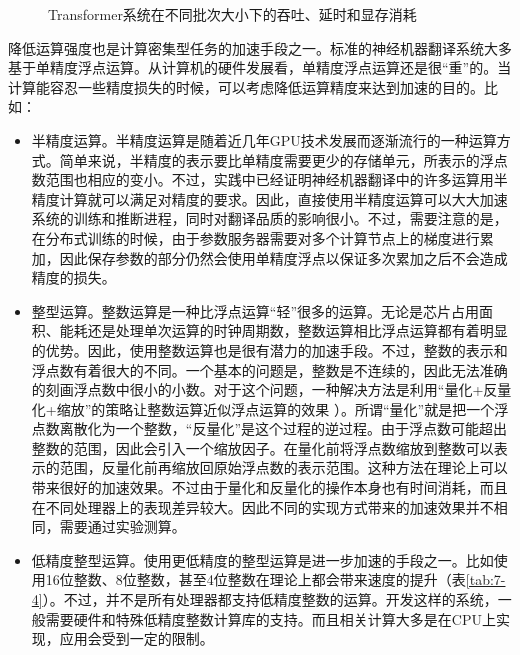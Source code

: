 \begin{figure}[htp]
\centering

\caption{Transformer系统在不同批次大小下的吞吐、延时和显存消耗}
\label{fig:7-23}
\end{figure}

\vspace{0.5em}
\vspace{0.5em}

\parinterval 降低运算强度也是计算密集型任务的加速手段之一。标准的神经机器翻译系统大多基于单精度浮点运算。从计算机的硬件发展看，单精度浮点运算还是很``重''的。当计算能容忍一些精度损失的时候，可以考虑降低运算精度来达到加速的目的。比如：

\begin{itemize}
\vspace{0.5em}
\item 半精度运算。半精度运算是随着近几年GPU技术发展而逐渐流行的一种运算方式。简单来说，半精度的表示要比单精度需要更少的存储单元，所表示的浮点数范围也相应的变小。不过，实践中已经证明神经机器翻译中的许多运算用半精度计算就可以满足对精度的要求。因此，直接使用半精度运算可以大大加速系统的训练和推断进程，同时对翻译品质的影响很小。不过，需要注意的是，在分布式训练的时候，由于参数服务器需要对多个计算节点上的梯度进行累加，因此保存参数的部分仍然会使用单精度浮点以保证多次累加之后不会造成精度的损失。

\vspace{0.5em}
\item 整型运算。整数运算是一种比浮点运算``轻''很多的运算。无论是芯片占用面积、能耗还是处理单次运算的时钟周期数，整数运算相比浮点运算都有着明显的优势。因此，使用整数运算也是很有潜力的加速手段。不过，整数的表示和浮点数有着很大的不同。一个基本的问题是，整数是不连续的，因此无法准确的刻画浮点数中很小的小数。对于这个问题，一种解决方法是利用``量化+反量化+缩放''的策略让整数运算近似浮点运算的效果 \cite{DBLP:journals/corr/abs-1906-00532,DBLP:conf/cvpr/JacobKCZTHAK18,DBLP:journals/corr/abs-1910-10485}）。所谓``量化''就是把一个浮点数离散化为一个整数，``反量化''是这个过程的逆过程。由于浮点数可能超出整数的范围，因此会引入一个缩放因子。在量化前将浮点数缩放到整数可以表示的范围，反量化前再缩放回原始浮点数的表示范围。这种方法在理论上可以带来很好的加速效果。不过由于量化和反量化的操作本身也有时间消耗，而且在不同处理器上的表现差异较大。因此不同的实现方式带来的加速效果并不相同，需要通过实验测算。

\vspace{0.5em}
\item 低精度整型运算。使用更低精度的整型运算是进一步加速的手段之一。比如使用16位整数、8位整数，甚至4位整数在理论上都会带来速度的提升（表\ref{tab:7-4}）。不过，并不是所有处理器都支持低精度整数的运算。开发这样的系统，一般需要硬件和特殊低精度整数计算库的支持。而且相关计算大多是在CPU上实现，应用会受到一定的限制。


\end{itemize}
